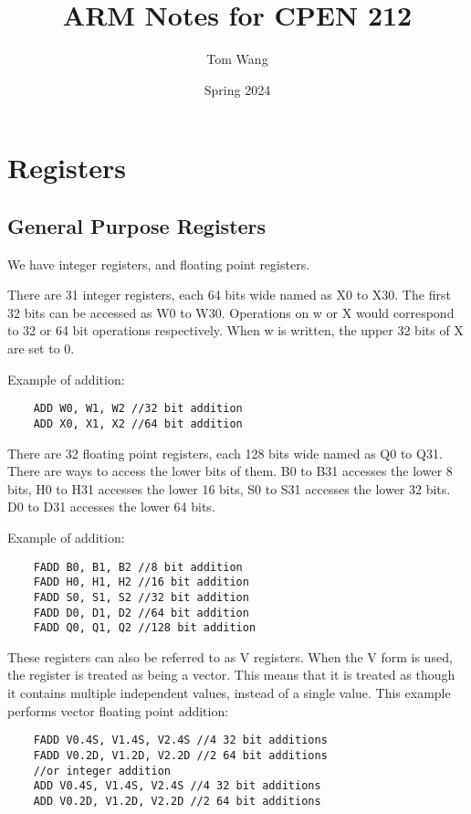 \documentclass[letterpaper,12pt]{article}
\title{ARM Notes for CPEN 212}
\author{Tom Wang}
\date{Spring 2024}
\begin{document}
\maketitle
\thispagestyle{plain}
\section{Registers}
\subsection{General Purpose Registers}
We have integer registers, and floating point registers.

There are 31 integer registers, each 64 bits wide named as X0 to X30. The first 32 bits can be accessed as W0 to W30. Operations on w or X would correspond to 32 or 64 bit operations respectively. When w is written, the upper 32 bits of X are set to 0. 

Example of addition: \begin{lstlisting}
    ADD W0, W1, W2 //32 bit addition
    ADD X0, X1, X2 //64 bit addition
\end{lstlisting}

There are 32 floating point registers, each 128 bits wide named as Q0 to Q31. There are ways to access the lower bits of them. B0 to B31 accesses the lower 8 bits, H0 to H31 accesses the lower 16 bits, S0 to S31 accesses the lower 32 bits. D0 to D31 accesses the lower 64 bits.

Example of addition: \begin{lstlisting}
    FADD B0, B1, B2 //8 bit addition
    FADD H0, H1, H2 //16 bit addition
    FADD S0, S1, S2 //32 bit addition
    FADD D0, D1, D2 //64 bit addition
    FADD Q0, Q1, Q2 //128 bit addition
\end{lstlisting}

These registers can also be referred to as V registers. When the V form is used, the register is treated as being a vector. This means that it is treated as though it contains multiple independent values, instead of a single value. This example performs vector floating point addition: \begin{lstlisting}
    FADD V0.4S, V1.4S, V2.4S //4 32 bit additions
    FADD V0.2D, V1.2D, V2.2D //2 64 bit additions
    //or integer addition
    ADD V0.4S, V1.4S, V2.4S //4 32 bit additions
    ADD V0.2D, V1.2D, V2.2D //2 64 bit additions
\end{lstlisting}
\end{document}

